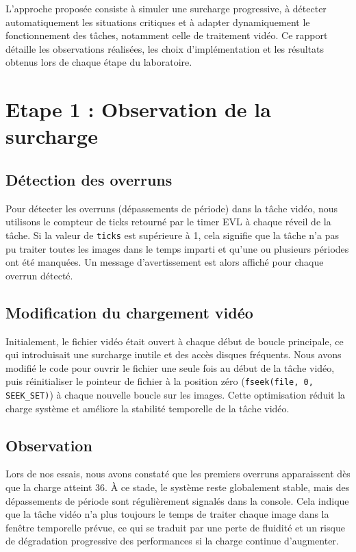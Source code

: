\documentclass[a4paper,12pt]{article}
\begin{document}
L'approche proposée consiste à simuler une surcharge progressive, à détecter automatiquement les situations critiques et à adapter dynamiquement le fonctionnement des tâches, notamment celle de traitement vidéo. Ce rapport détaille les observations réalisées, les choix d'implémentation et les résultats obtenus lors de chaque étape du laboratoire.

\newpage

\section{Etape 1 : Observation de la surcharge}

\subsection{Détection des overruns}

Pour détecter les overruns (dépassements de période) dans la tâche vidéo, nous utilisons le compteur de ticks retourné par le timer EVL à chaque réveil de la tâche. Si la valeur de \texttt{ticks} est supérieure à 1, cela signifie que la tâche n'a pas pu traiter toutes les images dans le temps imparti et qu'une ou plusieurs périodes ont été manquées. Un message d'avertissement est alors affiché pour chaque overrun détecté.

\subsection{Modification du chargement vidéo}

Initialement, le fichier vidéo était ouvert à chaque début de boucle principale, ce qui introduisait une surcharge inutile et des accès disques fréquents. Nous avons modifié le code pour ouvrir le fichier une seule fois au début de la tâche vidéo, puis réinitialiser le pointeur de fichier à la position zéro (\texttt{fseek(file, 0, SEEK\_SET)}) à chaque nouvelle boucle sur les images. Cette optimisation réduit la charge système et améliore la stabilité temporelle de la tâche vidéo.

\subsection{Observation}

Lors de nos essais, nous avons constaté que les premiers overruns apparaissent dès que la charge atteint 36. À ce stade, le système reste globalement stable, mais des dépassements de période sont régulièrement signalés dans la console. Cela indique que la tâche vidéo n'a plus toujours le temps de traiter chaque image dans la fenêtre temporelle prévue, ce qui se traduit par une perte de fluidité et un risque de dégradation progressive des performances si la charge continue d'augmenter.
\end{document}
